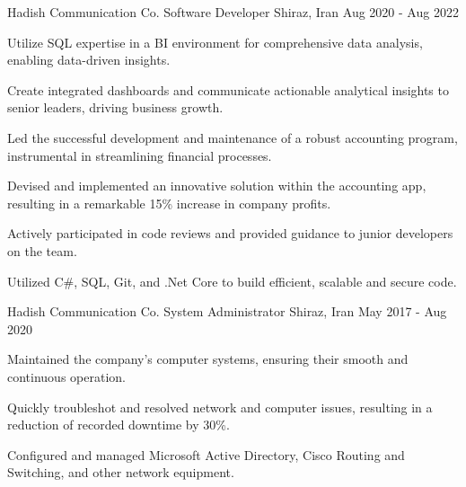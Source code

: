 

\begin{cventries}

    \cventry
    {Hadish Communication Co.} %
    {Software Developer} %
    {Shiraz, Iran} %
    {Aug 2020 - Aug 2022} %
    {
      \begin{cvitems} %
        \item {Utilize SQL expertise in a BI environment for comprehensive data analysis, enabling data-driven insights.}
        \item {Create integrated dashboards and communicate actionable analytical insights to senior leaders, driving business growth.}
        \item {Led the successful development and maintenance of a robust accounting program, instrumental in streamlining financial processes.}
        \item {Devised and implemented an innovative solution within the accounting app, resulting in a remarkable 15\% increase in company profits.}
        \item {Actively participated in code reviews and provided guidance to junior developers on the team.}
        \item {Utilized C\#, SQL, Git, and .Net Core to build efficient, scalable and secure code.}%
      \end{cvitems}
    }%
    \cventry
    {Hadish Communication Co.} %
    {System Administrator} %
    {Shiraz, Iran} %
    {May 2017 - Aug 2020} %
    {
      \begin{cvitems} %
        \item {Maintained the company's computer systems, ensuring their smooth and continuous operation.}
        \item {Quickly troubleshot and resolved network and computer issues, resulting in a reduction of recorded downtime by 30\%.}
        \item {Configured and managed Microsoft Active Directory, Cisco Routing and Switching, and other network equipment.}

\end{cvitems}}
\end{cventries}
